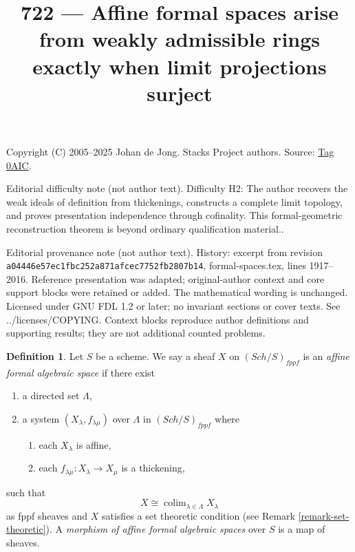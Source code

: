 \documentclass{amsart}
\theoremstyle{plain}
\theoremstyle{definition}
\newtheorem{definition}[subsection]{Definition}
\theoremstyle{remark}
\numberwithin{equation}{subsection}
\def\colim{\mathop{\mathrm{colim}}\nolimits}
\def\Sch{\mathit{Sch}}
\begin{document}
\title[Stacks Project, Tag 0AIC]{722 --- Affine formal spaces arise from weakly admissible rings exactly when limit projections surject}
\maketitle
\noindent Copyright (C) 2005--2025 Johan de Jong. Stacks Project authors. Source: \href{https://stacks.math.columbia.edu/tag/0AIC}{Tag 0AIC}.

\noindent Editorial difficulty note (not author text). Difficulty H2: The author recovers the weak ideals of definition from thickenings, constructs a complete limit topology, and proves presentation independence through cofinality. This formal-geometric reconstruction theorem is beyond ordinary qualification material..

\noindent Editorial provenance note (not author text). History: excerpt from revision \texttt{a0444\allowbreak 6e57e\allowbreak c1fbc\allowbreak 252a8\allowbreak 71afc\allowbreak ec775\allowbreak 2fb28\allowbreak 07b14}, formal-spaces.tex, lines 1917--2016. Reference presentation was adapted; original-author context and core support blocks were retained or added. The mathematical wording is unchanged. Licensed under GNU FDL 1.2 or later; no invariant sections or cover texts. See ../licenses/COPYING. Context blocks reproduce author definitions and supporting results; they are not additional counted problems.

\begin{definition}
\label{definition-affine-formal-algebraic-space}
Let $S$ be a scheme. We say a sheaf $X$ on $(\Sch/S)_{fppf}$ is an
{\it affine formal algebraic space} if there exist
\begin{enumerate}
\item a directed set $\Lambda$,
\item a system $(X_\lambda, f_{\lambda \mu})$ over $\Lambda$
in $(\Sch/S)_{fppf}$ where
\begin{enumerate}
\item each $X_\lambda$ is affine,
\item each $f_{\lambda \mu} : X_\lambda \to X_\mu$ is a thickening,
\end{enumerate}
\end{enumerate}
such that
$$
X \cong \colim_{\lambda \in \Lambda} X_\lambda
$$
as fppf sheaves and $X$ satisfies a set theoretic condition
(see Remark \ref{remark-set-theoretic}). A
{\it morphism of affine formal algebraic spaces}
over $S$ is a map of sheaves.
\end{definition}
\end{document}
